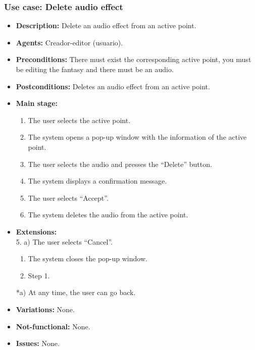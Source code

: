 \subsubsection{Use case: Delete audio effect}
\begin{itemize}
	\item \textbf{Description:} Delete an audio effect from an active point.
	\item \textbf{Agents:} Creador-editor (usuario).
	\item \textbf{Preconditions:} There must exist the corresponding active point, you must be editing the fantasy and there must be an audio.
	\item \textbf{Postconditions:} Deletes an audio effect from an active point.
	\item \textbf{Main stage:}
	\begin{enumerate}
		\item The user selects the active point.
		\item The system opens a pop-up window with the information of the active point.
		\item The user selects the audio and presses the ``Delete'' button.
		\item The system displays a confirmation message.
		\item The user selects ``Accept''.
		\item The system deletes the audio from the active point.
	\end{enumerate}
	\item \textbf{Extensions:} \\ 5. a) The user selects ``Cancel''.
	\begin{enumerate}
		\item The system closes the pop-up window.
		\item Step 1.
	\end{enumerate}
	*a) At any time, the user can go back.
	\item \textbf{Variations:} None.
	\item \textbf{Not-functional:} None.
	\item \textbf{Issues:} None.
\end{itemize}



